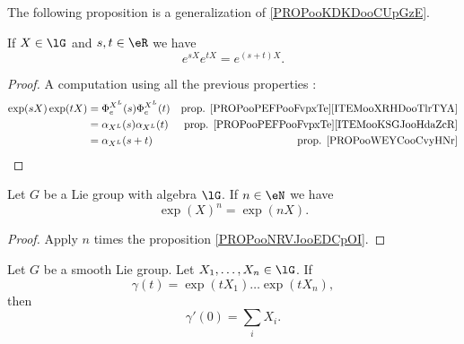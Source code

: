 The following proposition is a generalization of \ref{PROPooKDKDooCUpGzE}.
\begin{proposition}     \label{PROPooNRVJooEDCpOI}
	If \( X\in \lG\) and \( s,t\in \eR\) we have
	\begin{equation}
		e^{sX} e^{tX}= e^{(s+t)X}.
	\end{equation}
\end{proposition}

\begin{proof}
	A computation using all the previous properties :
	\begin{subequations}
		\begin{align}
			\exp(sX)\exp(tX) & =\Phi_e^{X^L}(s)\Phi_e^{X^L}(t) & \text{prop. \ref{PROPooPEFPooFvpxTe}\ref{ITEMooXRHDooTlrTYA}} \\
			                 & =\alpha_{X^L}(s)\alpha_{X^L}(t) & \text{prop. \ref{PROPooPEFPooFvpxTe}\ref{ITEMooKSGJooHdaZcR}} \\
			                 & =\alpha_{X^L}(s+t)              & \text{prop. \ref{PROPooWEYCooCvyHNr}}
		\end{align}
	\end{subequations}
\end{proof}

\begin{lemma}       \label{LEMooRPHVooAtZJnz}
	Let \( G\) be a Lie group with algebra \( \lG\). If \( n\in \eN\) we have
	\begin{equation}
		\exp(X)^n=\exp(nX).
	\end{equation}
\end{lemma}

\begin{proof}
	Apply \( n\) times the proposition \ref{PROPooNRVJooEDCpOI}.
\end{proof}

\begin{proposition}	\label{PROPooFJNEooKUhJUl}
	Let \( G\) be a smooth Lie group. Let \( X_1,\ldots,X_n\in \lG\). If
	\begin{equation}
		\gamma(t)=\exp(tX_1)\ldots \exp(tX_n),
	\end{equation}
	then
	\begin{equation}
		\gamma'(0)=\sum_iX_i.
	\end{equation}
\end{proposition}



